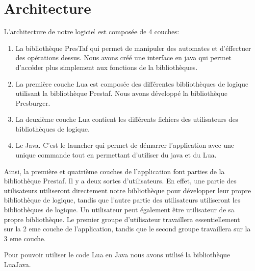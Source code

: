\section{Architecture}

L'architecture de notre logiciel est composée de 4 couches:
\begin{enumerate}
	\item La bibliothèque PresTaf qui permet de manipuler des automates et d'éffectuer des opérations dessus. Nous avons créé une interface en java qui permet d'accéder plus simplement aux fonctions de la bibliothèques.
	\item La première couche Lua est composée des différentes bibliothèques de logique utilisant la bibliothèque Prestaf. Nous avons développé la bibliothèque Presburger.
	\item La deuxième couche Lua contient les différents fichiers des utilisateurs des bibliothèques de logique.
	\item Le Java. C'est le launcher qui permet de démarrer l'application avec une unique commande tout en permettant d'utiliser du java et du Lua.
\end{enumerate}

Ainsi, la première et quatrième couches de l'application font parties de la bibliothèque Prestaf. Il y a deux sortes d'utilisateurs. En effet, une partie des utilisateurs utiliseront directement notre bibliothèque pour développer leur propre bibliothèque de logique, tandis que l'autre partie des utilisateurs utiliseront les bibliothèques de logique. Un utilisateur peut également être utilisateur de sa propre bibliothèque. Le premier groupe d'utilisateur travaillera essentiellement sur la 2 eme couche de l'application, tandis que le second groupe travaillera sur la 3 eme couche.\par

Pour pouvoir utiliser le code Lua en Java nous avons utilisé la bibliothèque LuaJava.\\


